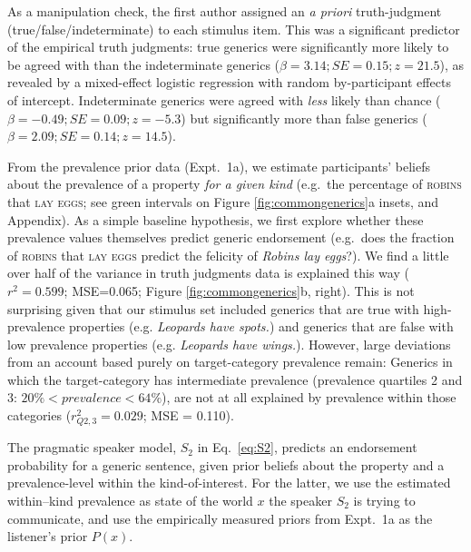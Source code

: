 \documentclass[12pt,letterpaper]{article}
\newcommand{\mht}[1]{\textcolor{Blue}{[mht: #1]}}
\begin{document}
 As a manipulation check, the first author assigned an \emph{a priori} truth-judgment (true/false/indeterminate) to each stimulus item.
This was a significant predictor of the empirical truth judgments: true generics were significantly more likely to be agreed with than the indeterminate generics ($\beta = 3.14; SE = 0.15; z = 21.5$), as revealed by a mixed-effect logistic regression with random by-participant effects of intercept.
Indeterminate generics were agreed with \emph{less} likely than chance ($\beta = -0.49; SE = 0.09; z = -5.3$) but significantly more than false generics ($\beta = 2.09; SE = 0.14; z = 14.5$).

 
 
From the prevalence prior data (Expt.~1a), we estimate participants' beliefs about the prevalence of a property \emph{for a given kind} (e.g.~the percentage of \textsc{robins} that \textsc{lay eggs}; see green intervals on Figure \ref{fig:commongenerics}a insets, and Appendix).
As a simple baseline hypothesis, we first explore whether these prevalence values themselves predict generic endorsement (e.g.~does the fraction of \textsc{robins} that \textsc{lay eggs} predict the felicity of \emph{Robins lay eggs}?).
We find a little over half of the variance in truth judgments data is explained this way ($r^2 = 0.599$; MSE=0.065; Figure \ref{fig:commongenerics}b, right). 
This is not surprising given that our stimulus set included generics that are true with high-prevalence properties (e.g. \emph{Leopards have spots.}) and  generics that are false with low prevalence properties (e.g. \emph{Leopards have wings.}). 
However, large deviations from an account based purely on target-category prevalence remain: Generics in which the target-category has intermediate prevalence (prevalence quartiles 2 and 3: $ 20\% < prevalence < 64\%$), are not at all explained by prevalence within those categories ($r_{Q2,3}^2 = 0.029$; MSE = 0.110).



The pragmatic speaker model, $S_2$ in Eq.~\ref{eq:S2}, predicts an endorsement probability for a generic sentence, given prior beliefs about the property and a prevalence-level within the kind-of-interest. 
For the latter, we use the estimated within--kind prevalence as state of the world $x$ the speaker $S_2$ is trying to communicate, and use the empirically measured priors from Expt.~1a as the listener's prior $P(x)$. 
\end{document}
